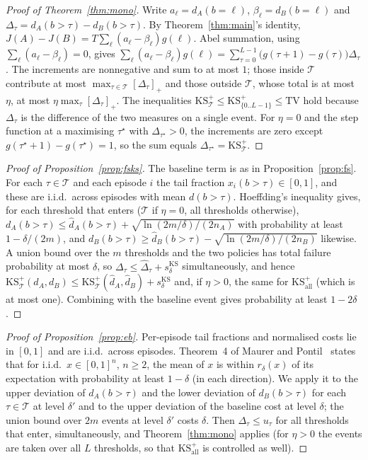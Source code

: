 \documentclass{article}
\newcommand{\TV}{\mathrm{TV}}
\begin{document}
\begin{proof}[Proof of Theorem~\ref{thm:mono}]
Write $a_\ell=d_A(b=\ell)$, $\beta_\ell=d_B(b=\ell)$ and $\Delta_\tau=d_A(b>\tau)-d_B(b>\tau)$. By Theorem~\ref{thm:main}'s identity, $J(A)-J(B)=T\sum_\ell(a_\ell-\beta_\ell)g(\ell)$. Abel summation, using $\sum_\ell(a_\ell-\beta_\ell)=0$, gives $\sum_\ell(a_\ell-\beta_\ell)g(\ell)=\sum_{\tau=0}^{L-1}\bigl(g(\tau+1)-g(\tau)\bigr)\Delta_\tau$. The increments are nonnegative and sum to at most $1$; those inside $\mathcal T$ contribute at most $\max_{\tau\in\mathcal T}[\Delta_\tau]_+$ and those outside $\mathcal T$, whose total is at most $\eta$, at most $\eta\max_\tau[\Delta_\tau]_+$. The inequalities $\mathrm{KS}^+_{\mathcal T}\le\mathrm{KS}^+_{\{0..L-1\}}\le\TV$ hold because $\Delta_\tau$ is the difference of the two measures on a single event. For $\eta=0$ and the step function at a maximising $\tau^\star$ with $\Delta_{\tau^\star}>0$, the increments are zero except $g(\tau^\star+1)-g(\tau^\star)=1$, so the sum equals $\Delta_{\tau^\star}=\mathrm{KS}^+_{\mathcal T}$.
\end{proof}

\begin{proof}[Proof of Proposition~\ref{prop:fsks}]
The baseline term is as in Proposition~\ref{prop:fs}. For each $\tau\in\mathcal T$ and each episode $i$ the tail fraction $x_i(b>\tau)\in[0,1]$, and these are i.i.d.\ across episodes with mean $d(b>\tau)$. Hoeffding's inequality gives, for each threshold that enters ($\mathcal T$ if $\eta=0$, all thresholds otherwise), $d_A(b>\tau)\le\hat d_A(b>\tau)+\sqrt{\ln(2m/\delta)/(2n_A)}$ with probability at least $1-\delta/(2m)$, and $d_B(b>\tau)\ge\hat d_B(b>\tau)-\sqrt{\ln(2m/\delta)/(2n_B)}$ likewise. A union bound over the $m$ thresholds and the two policies has total failure probability at most $\delta$, so $\Delta_\tau\le\hat\Delta_\tau+s^{\mathrm{KS}}_\delta$ simultaneously, and hence $\mathrm{KS}^+_{\mathcal T}(d_A,d_B)\le\mathrm{KS}^+_{\mathcal T}(\hat d_A,\hat d_B)+s^{\mathrm{KS}}_\delta$ and, if $\eta>0$, the same for $\mathrm{KS}^+_{\mathrm{all}}$ (which is at most one). Combining with the baseline event gives probability at least $1-2\delta$.
\end{proof}

\begin{proof}[Proof of Proposition~\ref{prop:eb}]
Per-episode tail fractions and normalised costs lie in $[0,1]$ and are i.i.d.\ across episodes. Theorem~4 of Maurer and Pontil~\citep{maurer2009eb} states that for i.i.d.\ $x\in[0,1]^n$, $n\ge2$, the mean of $x$ is within $r_\delta(x)$ of its expectation with probability at least $1-\delta$ (in each direction). We apply it to the upper deviation of $d_A(b>\tau)$ and the lower deviation of $d_B(b>\tau)$ for each $\tau\in\mathcal T$ at level $\delta'$ and to the upper deviation of the baseline cost at level $\delta$; the union bound over $2m$ events at level $\delta'$ costs $\delta$. Then $\Delta_\tau\le u_\tau$ for all thresholds that enter, simultaneously, and Theorem~\ref{thm:mono} applies (for $\eta>0$ the events are taken over all $L$ thresholds, so that $\mathrm{KS}^+_{\mathrm{all}}$ is controlled as well).
\end{proof}
\end{document}

